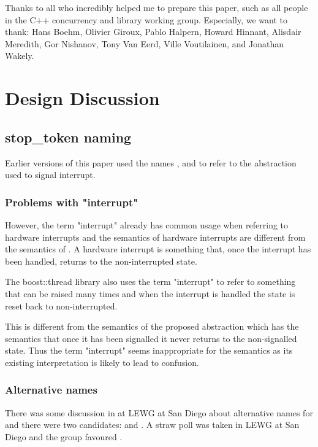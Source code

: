 Thanks to all who incredibly helped me to prepare this paper, such as all people in the C++ concurrency and library working group.
Especially, we want to thank:
 Hans Boehm, Olivier Giroux, Pablo Halpern, Howard Hinnant, Alisdair Meredith, Gor Nishanov,
 Tony Van Eerd, Ville Voutilainen, and Jonathan Wakely.

\section*{Design Discussion}

\subsection*{stop_token naming}

Earlier versions of this paper used the names ,
 and  to refer to the
abstraction used to signal interrupt.

\subsubsection*{Problems with "interrupt"}

However, the term "interrupt" already has common usage when referring to
hardware interrupts and the semantics of hardware interrupts are different
from the semantics of . A hardware interrupt is something
that, once the interrupt has been handled, returns to the non-interrupted state.

The boost::thread library also uses the term "interrupt" to refer to something
that can be raised many times and when the interrupt is handled the state is
reset back to non-interrupted.

This is different from the semantics of the proposed 
abstraction which has the semantics that once it has been signalled it never
returns to the non-signalled state. Thus the term "interrupt" seems inappropriate
for the semantics as its existing interpretation is likely to lead to confusion.

\subsubsection*{Alternative names}

There was some discussion in at LEWG at San Diego about alternative names
for  and there were two candidates:
 and .
A straw poll was taken in LEWG at San Diego and the group favoured .

